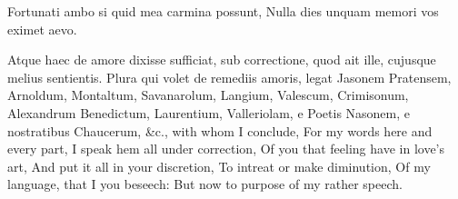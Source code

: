 {Fortunati ambo si quid mea carmina possunt,
Nulla dies unquam memori vos eximet aevo.

Atque haec de amore dixisse sufficiat, sub correctione, quod ait
ille, cujusque melius sentientis. Plura qui volet de remediis amoris,
legat Jasonem Pratensem, Arnoldum, Montaltum, Savanarolum, Langium,
Valescum, Crimisonum, Alexandrum Benedictum, Laurentium, Valleriolam, e
Poetis Nasonem, e nostratibus Chaucerum, \&c., with whom I conclude,
For my words here and every part,
I speak hem all under correction,
Of you that feeling have in love's art,
And put it all in your discretion,
To intreat or make diminution,
Of my language, that I you beseech:
But now to purpose of my rather speech.
}
